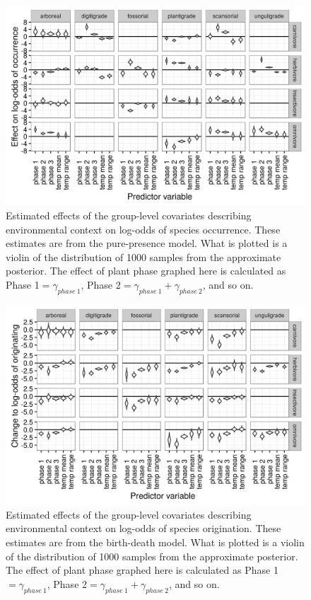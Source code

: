 \documentclass[12pt,letterpaper]{article}
\begin{document}
\begin{figure}[ht]
  \centering
  \includegraphics[width=\textwidth,height=0.4\textheight,keepaspectratio=true]{figure/group_on_ecotype}
  \caption[Effects of group-level covariates on log-odds of ecotype occurrence as estimated from the pure-presence model]{Estimated effects of the group-level covariates describing environmental context on log-odds of species occurrence. These estimates are from the pure-presence model. What is plotted is a violin of the distribution of 1000 samples from the approximate posterior. The effect of plant phase graphed here is calculated as Phase 1\( = \gamma_{phase\ 1}\), Phase 2\( = \gamma_{phase\ 1} + \gamma_{phase\ 2}\), and so on.} 
  \label{fig:group_pure_presence}
\end{figure}

\begin{figure}[ht]
  \centering
  \includegraphics[width=\textwidth,height=0.4\textheight,keepaspectratio=true]{figure/group_on_origin_bd}
  \caption[Effects of group-level covariates on log-odds of ecotype origination as estimated from the birth-death model]{Estimated effects of the group-level covariates describing environmental context on log-odds of species origination. These estimates are from the birth-death model. What is plotted is a violin of the distribution of 1000 samples from the approximate posterior. The effect of plant phase graphed here is calculated as Phase 1\( = \gamma_{phase\ 1}\), Phase 2\( = \gamma_{phase\ 1} + \gamma_{phase\ 2}\), and so on.} 
  \label{fig:group_origin_bd}
\end{figure}
\end{document}

